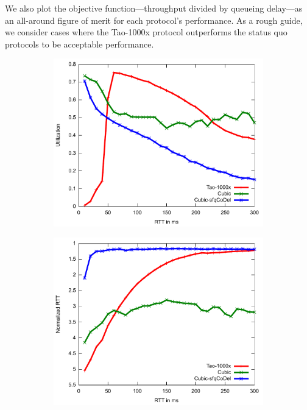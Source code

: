 We also plot the objective function---throughput divided by queueing
delay---as an all-around figure of merit for each protocol's
performance. As a rough guide, we consider cases where the Tao-1000x
protocol outperforms the status quo protocols to be acceptable
performance.

\begin{figure}
\centering
\begin{subfigure}[b]{0.33\textwidth}
\includegraphics[width=\textwidth]{figures/rtt-agility-tpt.pdf}
\end{subfigure}
\begin{subfigure}[b]{0.33\textwidth}
\includegraphics[width=\textwidth]{figures/rtt-agility-delay.pdf}

\end{subfigure}
\end{figure}
